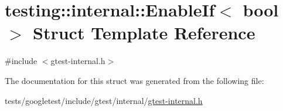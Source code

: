 \hypertarget{structtesting_1_1internal_1_1EnableIf}{}\section{testing\+:\+:internal\+:\+:Enable\+If$<$ bool $>$ Struct Template Reference}
\label{structtesting_1_1internal_1_1EnableIf}


{\ttfamily \#include $<$gtest-\/internal.\+h$>$}



The documentation for this struct was generated from the following file\+:\begin{DoxyCompactItemize}
\item 
tests/googletest/include/gtest/internal/\hyperlink{gtest-internal_8h}{gtest-\/internal.\+h}\end{DoxyCompactItemize}
